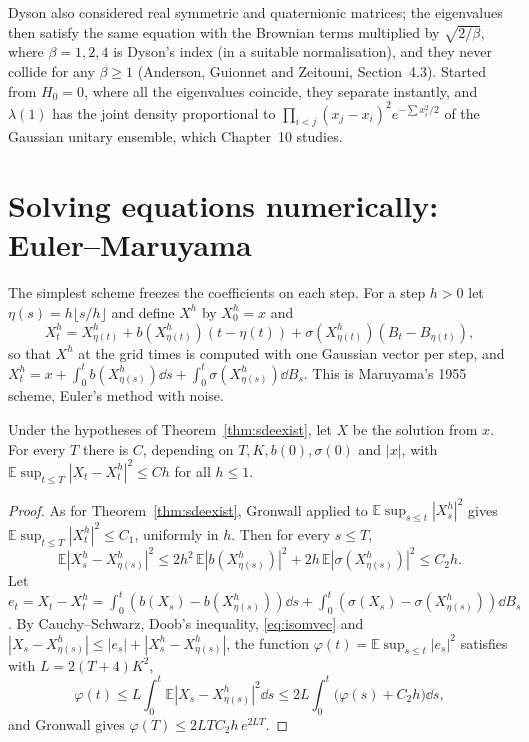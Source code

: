 \begin{remark}
Dyson also considered real symmetric and quaternionic matrices; the eigenvalues then satisfy the same equation with the Brownian terms multiplied by $\sqrt{2/\beta}$, where $\beta=1,2,4$ is Dyson's index (in a suitable normalisation), and
they never collide for any $\beta\ge1$ (Anderson, Guionnet and Zeitouni, Section~4.3). Started from $H_0=0$, where all the eigenvalues coincide, they separate instantly, and $\lambda(1)$ has the joint density proportional to
$\prod_{i<j}(x_j-x_i)^2e^{-\sum x_i^2/2}$ of the Gaussian unitary ensemble, which Chapter~10 studies.
\end{remark}

\section{Solving equations numerically: Euler--Maruyama}

The simplest scheme freezes the coefficients on each step. For a step $h>0$ let $\eta(s)=h\lfloor s/h\rfloor$ and define $X^h$ by $X^h_0=x$ and
\[
X^h_t=X^h_{\eta(t)}+b(X^h_{\eta(t)})(t-\eta(t))+\sigma(X^h_{\eta(t)})(B_t-B_{\eta(t)}) ,
\]
so that $X^h$ at the grid times is computed with one Gaussian vector per step, and $X^h_t=x+\int_0^tb(X^h_{\eta(s)})\dd s+\int_0^t\sigma(X^h_{\eta(s)})\dd B_s$. This is Maruyama's 1955 scheme, Euler's method with noise.

\begin{theorem}\label{thm:eulermaruyama}
Under the hypotheses of Theorem~\ref{thm:sdeexist}, let $X$ be the solution from $x$. For every $T$ there is $C$, depending on $T,K,b(0),\sigma(0)$ and $|x|$, with
$\mathbb E\sup_{t\le T}|X_t-X^h_t|^2\le Ch$ for all $h\le1$.
\end{theorem}

\begin{proof}
As for Theorem~\ref{thm:sdeexist}, Gronwall applied to $\mathbb E\sup_{s\le t}|X^h_s|^2$ gives $\mathbb E\sup_{t\le T}|X^h_t|^2\le C_1$, uniformly in $h$. Then for every $s\le T$,
\[
\mathbb E|X^h_s-X^h_{\eta(s)}|^2\le2h^2\,\mathbb E|b(X^h_{\eta(s)})|^2+2h\,\mathbb E|\sigma(X^h_{\eta(s)})|^2\le C_2h.
\]
Let $e_t=X_t-X^h_t=\int_0^t(b(X_s)-b(X^h_{\eta(s)}))\dd s+\int_0^t(\sigma(X_s)-\sigma(X^h_{\eta(s)}))\dd B_s$. By Cauchy--Schwarz, Doob's inequality, \eqref{eq:isomvec} and
$|X_s-X^h_{\eta(s)}|\le|e_s|+|X^h_s-X^h_{\eta(s)}|$, the function $\varphi(t)=\mathbb E\sup_{s\le t}|e_s|^2$ satisfies
with $L=2(T+4)K^2$,
\[
\varphi(t)\le L\int_0^t\mathbb E|X_s-X^h_{\eta(s)}|^2\dd s\le2L\int_0^t\bigl(\varphi(s)+C_2h\bigr)\dd s ,
\]
and Gronwall gives $\varphi(T)\le2LTC_2h\,e^{2LT}$.
\end{proof}

